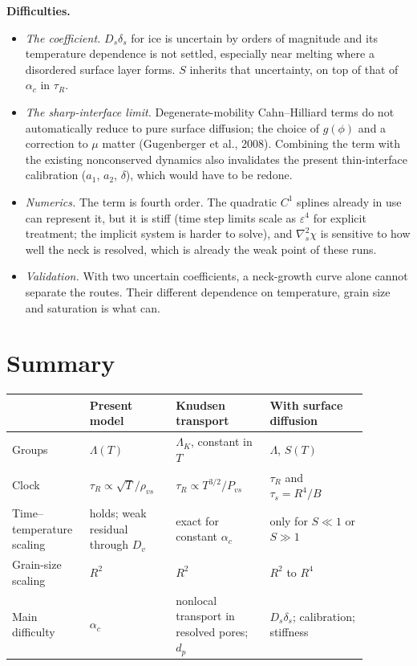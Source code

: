 \documentclass[11pt]{article}
\newcommand{\rvs}{\rho_{vs}}
\begin{document}
\textbf{Difficulties.}
\begin{itemize}
\item \emph{The coefficient.} $D_s\delta_s$ for ice is uncertain by orders of
  magnitude and its temperature dependence is not settled, especially near
  melting where a disordered surface layer forms. $S$ inherits that
  uncertainty, on top of that of $\alpha_c$ in $\tau_{R}$.
\item \emph{The sharp-interface limit.} Degenerate-mobility Cahn--Hilliard
  terms do not automatically reduce to pure surface diffusion; the choice of
  $g(\phi)$ and a correction to $\mu$ matter (Gugenberger et al., 2008).
  Combining the term with the existing nonconserved dynamics also
  invalidates the present thin-interface calibration ($a_1$, $a_2$,
  $\delta$), which would have to be redone.
\item \emph{Numerics.} The term is fourth order. The quadratic $C^{1}$
  splines already in use can represent it, but it is stiff (time step
  limits scale as $\varepsilon^{4}$ for explicit treatment; the implicit
  system is harder to solve), and $\nabla_s^{2}\chi$ is sensitive to how well
  the neck is resolved, which is already the weak point of these runs.
\item \emph{Validation.} With two uncertain coefficients, a neck-growth
  curve alone cannot separate the routes. Their different dependence on
  temperature, grain size and saturation is what can.
\end{itemize}

\section{Summary}

\begin{center}\footnotesize\begin{tabular}{p{0.17\linewidth}p{0.22\linewidth}p{0.24\linewidth}p{0.25\linewidth}}\toprule
 & Present model & Knudsen transport & With surface diffusion\\\midrule
Groups & $\Lambda(T)$ & $\Lambda_K$, constant in $T$ & $\Lambda$, $S(T)$\\
Clock & $\tau_{R} \propto \sqrt T/\rvs$ & $\tau_{R} \propto T^{3/2}/P_{vs}$ & $\tau_{R}$ and $\tau_s = R^{4}/B$\\
Time--temperature scaling & holds; weak residual through $D_v$ & exact for constant $\alpha_c$ & only for $S \ll 1$ or $S \gg 1$\\
Grain-size scaling & $R^{2}$ & $R^{2}$ & $R^{2}$ to $R^{4}$\\
Main difficulty & $\alpha_c$ & nonlocal transport in resolved pores; $d_p$ & $D_s\delta_s$; calibration; stiffness\\\bottomrule
\end{tabular}\end{center}
\end{document}
